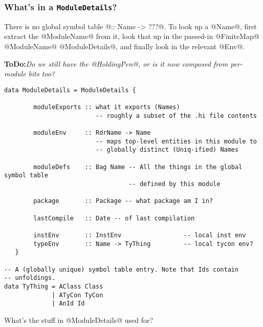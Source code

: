\documentclass[11pt]{article}
\newcommand{\ToDo}[1]{{{\bf ToDo:}\sl #1}}
\begin{document}
\subsubsection*{What's in a \mbox{\tt ModuleDetails}?}

There is no global symbol table @:: Name -> ???@.  To look up a
@Name@, first extract the @ModuleName@ from it, look that up in
the passed-in @FiniteMap@ @ModuleName@ @ModuleDetails@, 
and finally look in the relevant @Env@.

\ToDo{Do we still have the @HoldingPen@, or is it now composed from
per-module bits too?}
\begin{verbatim}
data ModuleDetails = ModuleDetails {

        moduleExports :: what it exports (Names)
                         -- roughly a subset of the .hi file contents

        moduleEnv     :: RdrName -> Name
                         -- maps top-level entities in this module to
                         -- globally distinct (Uniq-ified) Names
  
        moduleDefs    :: Bag Name -- All the things in the global symbol table
                                  -- defined by this module

        package       :: Package -- what package am I in?

        lastCompile   :: Date -- of last compilation

        instEnv       :: InstEnv                 -- local inst env
        typeEnv       :: Name -> TyThing         -- local tycon env?
   }

-- A (globally unique) symbol table entry. Note that Ids contain
-- unfoldings. 
data TyThing = AClass Class
             | ATyCon TyCon
             | AnId Id 
\end{verbatim}
What's the stuff in @ModuleDetails@ used for?
\end{document}

